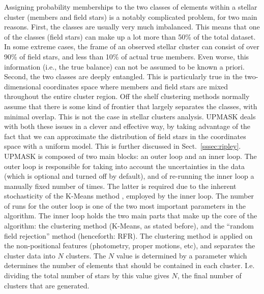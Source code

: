 \documentclass[draft]{aa}
\begin{document}
 Assigning probability memberships to the two classes of elements within a 
 stellar cluster (members and field stars) is a notably complicated
 problem, for two main reasons. First, the classes are usually very much
 imbalanced. This means that one of the classes (field stars) can make up a
 lot more than 50\% of the total dataset. In some extreme cases, the frame of
 an observed stellar cluster can consist of over 90\% of field stars, and less
 than 10\% of actual true members. Even worse, this information (i.e., the
 true balance) can not be assumed to be known a priori.
 Second, the two classes are deeply entangled. This is particularly true in the
 two-dimensional coordinates space where members and field stars are mixed
 throughout the entire cluster region. Off the shelf clustering methods
 normally assume that there is some kind of frontier that largely separates
 the classes, with minimal overlap. This is not the case in stellar clusters
 analysis.
 UPMASK deals with both these issues in a clever and effective way, by taking
 advantage of the fact that we can approximate the distribution of field stars
 in the coordinates space with a uniform model. This is further discussed
 in Sect.~\ref{sssec:ripley}.\\

 UPMASK is composed of two main blocks: an outer loop and an inner
 loop. The outer loop is responsible for taking into account the uncertainties
 in the data (which is optional and turned off by default), and of re-running
 the inner loop a manually fixed number of times. The latter is required due
 to the inherent stochasticity of the K-Means method \citep{macqueen1967},
 employed by the inner loop. The number of runs for the outer loop is one of
 the two most important parameters in the algorithm.
 The inner loop holds the two main parts that make up the core of the
 algorithm: the clustering method (K-Means, as stated before), and the
 ``random field rejection'' method (henceforth: RFR).
 The clustering method is applied on the non-positional features (photometry,
 proper motions, etc), and separates the cluster data into $N$ clusters. The
 $N$ value is determined by a parameter
 which determines the number of elements that should be
 contained in each cluster. I.e. dividing the total number of stars by this
 value gives $N$, the final number of clusters that are generated.
 
\end{document}
